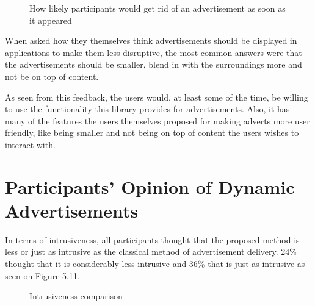 \begin{figure}
\begin{center}
\caption{How likely participants would get rid of an advertisement as soon as it appeared}
\end{center}
\end{figure}

When asked how they themselves think advertisements should be displayed in applications to make them less disruptive, the most common answers were that the advertisements should be smaller, blend in with the surroundings more and not be on top of content.

As seen from this feedback, the users would, at least some of the time, be willing to use the functionality this library provides for advertisements. Also, it has many of the features the users themselves proposed for making adverts more user friendly, like being smaller and not being on top of content the users wishes to interact with.

\section{Participants' Opinion of Dynamic Advertisements}

In terms of intrusiveness, all participants thought that the proposed method is less or just as intrusive as the classical method of advertisement delivery. 24\% thought that it is considerably less intrusive and 36\% that is just as intrusive as seen on Figure 5.11.

\begin{figure}
\begin{center}
\caption{Intrusiveness comparison}
\end{center}
\end{figure}

